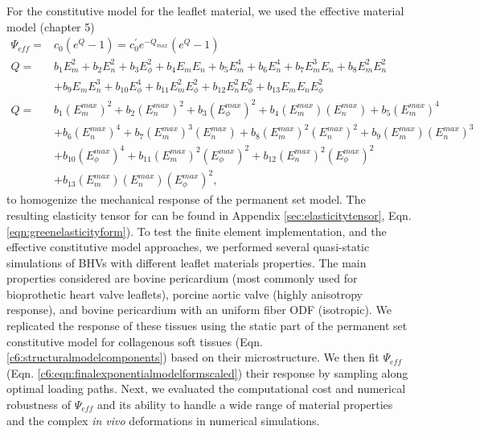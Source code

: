 	
	For the constitutive model for the leaflet material, we used the effective material model (chapter 5)
\begin{equation} \label{c6:eqn:finalexponentialmodelformscaled}
\begin{aligned}
\Psi_{eff} 	=& c_0 \left(e^{Q} - 1\right) = c_0^\prime e^{-Q_{max}}\left(e^{Q} - 1\right)    \\
Q		=& b_1 E_m^2 + b_2 E_n^2 + b_3 E_\phi^2 + b_4 E_m E_n + b_5 E_m^4 + b_6 E_n^4 + b_7 E_m^3 E_n + b_8 E_m^2 E_n^2 \\ 
&+ b_9 E_m E_n^3 + b_{10} E_\phi^4 + b_{11} E_m^2E_\phi^2 + b_{12} E_n^2 E_\phi^2 + b_{13} E_m E_n E_\phi^2 \\
Q		=& b_1 (E_m^{max})^2 + b_2 (E_n^{max})^2 + b_3 (E_\phi^{max})^2 + b_4 (E_m^{max}) (E_n^{max}) + b_5 (E_m^{max})^4   \\
    &+ b_6 (E_n^{max})^4 + b_7 (E_m^{max})^3 (E_n^{max}) + b_8 (E_m^{max})^2 (E_n^{max})^2 + b_9 (E_m^{max}) (E_n^{max})^3	\\
	&+ b_{10} (E_\phi^{max})^4 + b_{11} (E_m^{max})^2(E_\phi^{max})^2 + b_{12} (E_n^{max})^2 (E_\phi^{max})^2    \\ 
	&+ b_{13} (E_m^{max}) (E_n^{max}) (E_\phi^{max})^2,
\end{aligned}
\end{equation}
	to homogenize the mechanical response of the permanent set model. The resulting elasticity tensor for can be found in Appendix \ref{sec:elasticitytensor}, Eqn. \ref{eqn:greenelasticityform}). To test the finite element implementation, and the effective constitutive model approaches, we performed several quasi-static simulations of BHVs with different leaflet materials properties. The main properties considered are bovine pericardium (most commonly used for bioprothetic heart valve leaflets), porcine aortic valve (highly anisotropy response), and bovine pericardium with an uniform fiber ODF (isotropic). We replicated the response of these tissues using the static part of the permanent set constitutive model for collagenous soft tissues (Eqn. \ref{c6:structuralmodelcomponents}) based on their microstructure. We then fit $\Psi_{eff}$ (Eqn. \ref{c6:eqn:finalexponentialmodelformscaled}) their response by sampling along optimal loading paths. Next, we evaluated the computational cost and numerical robustness of $\Psi_{eff}$ and its ability to handle a wide range of material properties and the complex \textit{in vivo} deformations in numerical simulations.
    

